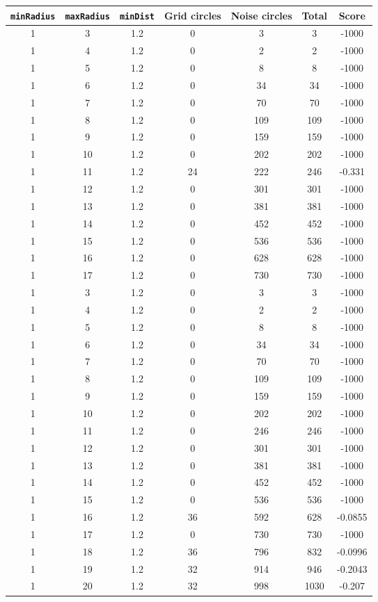 \documentclass[letterpaper, 12pt]{article}
\begin{document}
\begin{longtable}{|c|c|c|c|c|c|c|}
\hline
\textbf{\texttt{minRadius}} & \textbf{\texttt{maxRadius}} & \textbf{\texttt{minDist}} & \textbf{Grid circles} & \textbf{Noise circles} & \textbf{Total} & \textbf{Score} \\
\hline
1 & 3 & 1.2 & 0 & 3 & 3 & -1000 \\
\hline
1 & 4 & 1.2 & 0 & 2 & 2 & -1000 \\
\hline
1 & 5 & 1.2 & 0 & 8 & 8 & -1000 \\
\hline
1 & 6 & 1.2 & 0 & 34 & 34 & -1000 \\
\hline
1 & 7 & 1.2 & 0 & 70 & 70 & -1000 \\
\hline
1 & 8 & 1.2 & 0 & 109 & 109 & -1000 \\
\hline
1 & 9 & 1.2 & 0 & 159 & 159 & -1000 \\
\hline
1 & 10 & 1.2 & 0 & 202 & 202 & -1000 \\
\hline
1 & 11 & 1.2 & 24 & 222 & 246 & -0.331 \\
\hline
1 & 12 & 1.2 & 0 & 301 & 301 & -1000 \\
\hline
1 & 13 & 1.2 & 0 & 381 & 381 & -1000 \\
\hline
1 & 14 & 1.2 & 0 & 452 & 452 & -1000 \\
\hline
1 & 15 & 1.2 & 0 & 536 & 536 & -1000 \\
\hline
1 & 16 & 1.2 & 0 & 628 & 628 & -1000 \\
\hline
1 & 17 & 1.2 & 0 & 730 & 730 & -1000 \\
\hline
1 & 3 & 1.2 & 0 & 3 & 3 & -1000 \\
\hline
1 & 4 & 1.2 & 0 & 2 & 2 & -1000 \\
\hline
1 & 5 & 1.2 & 0 & 8 & 8 & -1000 \\
\hline
1 & 6 & 1.2 & 0 & 34 & 34 & -1000 \\
\hline
1 & 7 & 1.2 & 0 & 70 & 70 & -1000 \\
\hline
1 & 8 & 1.2 & 0 & 109 & 109 & -1000 \\
\hline
1 & 9 & 1.2 & 0 & 159 & 159 & -1000 \\
\hline
1 & 10 & 1.2 & 0 & 202 & 202 & -1000 \\
\hline
1 & 11 & 1.2 & 0 & 246 & 246 & -1000 \\
\hline
1 & 12 & 1.2 & 0 & 301 & 301 & -1000 \\
\hline
1 & 13 & 1.2 & 0 & 381 & 381 & -1000 \\
\hline
1 & 14 & 1.2 & 0 & 452 & 452 & -1000 \\
\hline
1 & 15 & 1.2 & 0 & 536 & 536 & -1000 \\
\hline
1 & 16 & 1.2 & 36 & 592 & 628 & -0.0855 \\
\hline
1 & 17 & 1.2 & 0 & 730 & 730 & -1000 \\
\hline
1 & 18 & 1.2 & 36 & 796 & 832 & -0.0996 \\
\hline
1 & 19 & 1.2 & 32 & 914 & 946 & -0.2043 \\
\hline
1 & 20 & 1.2 & 32 & 998 & 1030 & -0.207 \\
\hline
\end{longtable}
\end{document}
